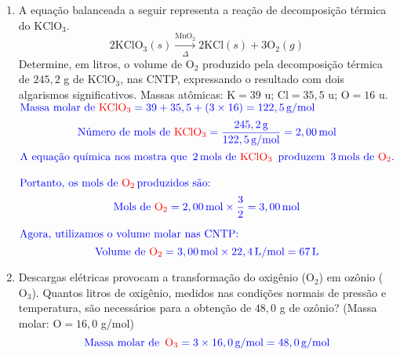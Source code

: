 \documentclass[a4paper, 12pt]{article}
\begin{document}
\begin{enumerate}

    \item A equação balanceada a seguir representa a reação de decomposição térmica
          do $\text{KClO}_{3}$.
          \[
              2\text{KClO}_{3}(s) \xrightarrow[\Delta]{\text{MnO}_2}2\text{KCl}(s) + 3\text{O}
              _{2}(g)
          \]
          Determine, em litros, o volume de $\text{O}_{2}$ produzido pela
          decomposição térmica de $245,2$ g de $\text{KClO}_{3}$, nas CNTP,
          expressando o resultado com dois algarismos significativos. Massas atômicas:
          $\text{K}= 39$ u; $\text{Cl}= 35,5$ u; $\text{O}= 16$ u.
          \\[10pt]
          $\textcolor{blue}{\text{Massa molar de \textcolor{red}{\(\text{KClO}_3\)}} = 39 + 35,5 + (3 \times 16) = 122,5 \, \text{g/mol}}$
          \[
              \textcolor{blue}{\text{Número de mols de \textcolor{red}{\(\text{KClO}_3\)}} = \frac{245,2 \, \text{g}}{122,5 \, \text{g/mol}} = 2,00 \, \text{mol}}
          \]
          $\textcolor{blue}{\text{A equação química nos mostra que } \, 2 \, \text{mols de \textcolor{red}{\(\text{KClO}_3\)}} \, \text{ produzem } \, 3 \, \text{mols de \textcolor{red}{\(\text{O}_2\)}}.}$
          \\ \\
          $\textcolor{blue}{\text{Portanto, os mols de \textcolor{red}{\(\text{O}_2\)}} \, \text{produzidos são:}}$
          \[
              \textcolor{blue}{\text{Mols de \textcolor{red}{\(\text{O}_2\)}} = 2,00 \, \text{mol} \times \frac{3}{2} = 3,00 \, \text{mol}}
          \]

          $\textcolor{blue}{\text{Agora, utilizamos o volume molar nas CNTP:}}$
          \[
              \textcolor{blue}{\text{Volume de \textcolor{red}{\(\text{O}_2\)}} = 3,00 \, \text{mol} \times 22,4 \, \text{L/mol} = 67 \, \text{L}}
          \]



    \item Descargas elétricas provocam a transformação do oxigênio ($\text{O}_{2}$)
          em ozônio ($\text{O}_{3}$). Quantos litros de oxigênio, medidos nas condições
          normais de pressão e temperatura, são necessários para a obtenção de
          $48,0$ g de ozônio? (Massa molar: $\text{O}= 16,0$ g/mol)
          \[
              \textcolor{blue}{\text{Massa molar de } \, \textcolor{red}{\text{O}_3} = 3 \times 16,0 \, \text{g/mol} = 48,0 \, \text{g/mol}}
          \]


\end{enumerate}
\end{document}
